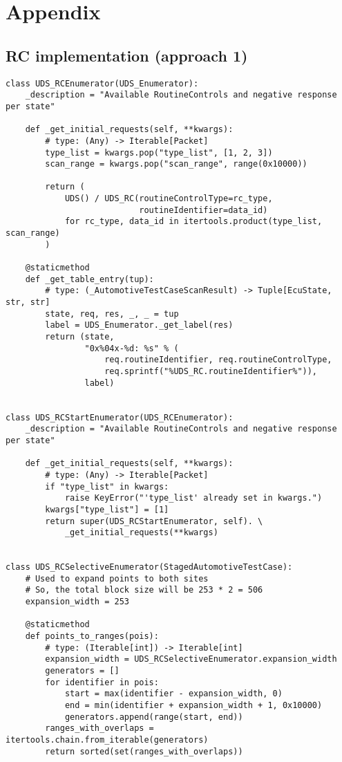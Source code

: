 \section{Appendix}

\subsection{RC implementation (approach 1)}

\begin{verbatim}
class UDS_RCEnumerator(UDS_Enumerator):
    _description = "Available RoutineControls and negative response per state"

    def _get_initial_requests(self, **kwargs):
        # type: (Any) -> Iterable[Packet]
        type_list = kwargs.pop("type_list", [1, 2, 3])
        scan_range = kwargs.pop("scan_range", range(0x10000))

        return (
            UDS() / UDS_RC(routineControlType=rc_type,
                           routineIdentifier=data_id)
            for rc_type, data_id in itertools.product(type_list, scan_range)
        )

    @staticmethod
    def _get_table_entry(tup):
        # type: (_AutomotiveTestCaseScanResult) -> Tuple[EcuState, str, str]
        state, req, res, _, _ = tup
        label = UDS_Enumerator._get_label(res)
        return (state,
                "0x%04x-%d: %s" % (
                    req.routineIdentifier, req.routineControlType,
                    req.sprintf("%UDS_RC.routineIdentifier%")),
                label)


class UDS_RCStartEnumerator(UDS_RCEnumerator):
    _description = "Available RoutineControls and negative response per state"

    def _get_initial_requests(self, **kwargs):
        # type: (Any) -> Iterable[Packet]
        if "type_list" in kwargs:
            raise KeyError("'type_list' already set in kwargs.")
        kwargs["type_list"] = [1]
        return super(UDS_RCStartEnumerator, self). \
            _get_initial_requests(**kwargs)


class UDS_RCSelectiveEnumerator(StagedAutomotiveTestCase):
    # Used to expand points to both sites
    # So, the total block size will be 253 * 2 = 506
    expansion_width = 253

    @staticmethod
    def points_to_ranges(pois):
        # type: (Iterable[int]) -> Iterable[int]
        expansion_width = UDS_RCSelectiveEnumerator.expansion_width
        generators = []
        for identifier in pois:
            start = max(identifier - expansion_width, 0)
            end = min(identifier + expansion_width + 1, 0x10000)
            generators.append(range(start, end))
        ranges_with_overlaps = itertools.chain.from_iterable(generators)
        return sorted(set(ranges_with_overlaps))


\end{verbatim}
